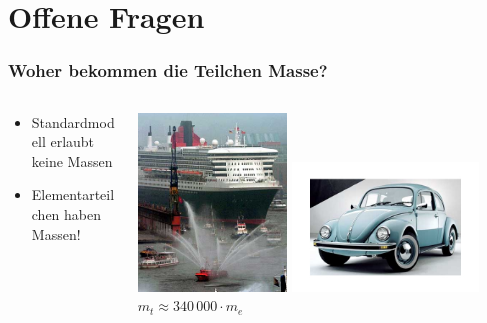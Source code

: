 \documentclass{beamer}
\begin{document}
\section{Offene Fragen}
\begin{frame}
  \frametitle{Woher bekommen die Teilchen Masse?}
  \begin{columns}
    \begin{column}{0.6\textwidth}
      \begin{itemize}
      \item Standardmodell erlaubt keine Massen
      \item \alert{Elementarteilchen haben Massen!}
      \end{itemize}
    \end{column}
    \begin{column}{0.4\textwidth}
      \begin{center}
        \includegraphics[width=0.4\textwidth]{sm/QueenMary2.jpg}
        \includegraphics[width=0.5\textwidth]{sm/VWKaefer.jpg}\\
        $m_{t} \approx340\,000 \cdot m_{e}$
      \end{center}
    \end{column}
  \end{columns}
  \pause
  \vskip0.5cm
  \begin{columns}
   \begin{column}{0.5\textwidth}

\end{column}
\end{columns}
\end{frame}
\end{document}
